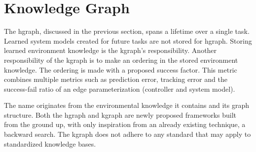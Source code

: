 \section{Knowledge Graph}%
\label{sec:kgraph}
The \ac{hgraph}, discussed in the previous section, spans a lifetime over a single task. Learned system models created for future tasks are not stored for \ac{hgraph}. Storing learned environment knowledge is the \ac{kgraph}'s responsibility. Another responsibility of the \ac{kgraph} is to make an ordering in the stored environment knowledge. The ordering is made with a proposed success factor. This metric combines multiple metrics such as prediction error, tracking error and the success-fail ratio of an edge parameterization (controller and system model).\bs

The name  originates from the environmental knowledge it contains and its graph structure. Both the \ac{hgraph} and \ac{kgraph} are newly proposed frameworks built from the ground up, with only inspiration from an already existing technique, a backward search. The \ac{kgraph} does not adhere to any standard that may apply to standardized knowledge bases.\bs





